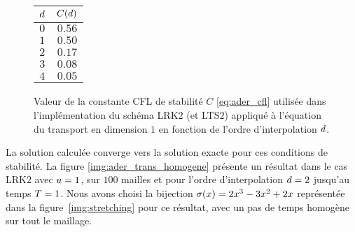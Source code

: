 \begin{figure}[!h]
	\begin{center}
		\caption{
			\label{tab:ader_trans_cfl}
			Valeur de la constante CFL de stabilité $C$ \eqref{eq:ader_cfl}
			utilisée dans l'implémentation du schéma LRK$2$ (et LTS$2$)
			appliqué à l'équation du transport en dimension $1$
			en fonction de l'ordre d'interpolation $d$.
		}
		
		\begin{tabular}{|c|c|}
			\hline
			$d$ & $C(d)$ \\ \hline\hline
			$0$ & $0.56$ \\	\hline
			$1$ & $0.50$ \\	\hline
			$2$ & $0.17$ \\	\hline
			$3$ & $0.08$ \\	\hline
			$4$ & $0.05$ \\	\hline
		\end{tabular}
	\end{center}
\end{figure}




La solution calculée converge vers la solution exacte pour ces conditions
de stabilité. La figure \ref{img:ader_trans_homogene} présente un résultat
dans le cas LRK$2$ avec $u = 1$, sur $100$ mailles et
pour l'ordre d'interpolation $d = 2$ jusqu'au temps $T=1$.
Nous avons choisi la bijection $\sigma(x) = 2 x^3 - 3 x^2 + 2 x$
représentée dans la figure~\ref{img:stretching} pour ce résultat,
avec un pas de temps homogène sur tout le maillage.


